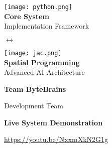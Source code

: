 \documentclass[12pt,a4paper]{article}
\begin{document}
\begin{titlepage}
\begin{tcolorbox}[
        colback=premiumgray,
        colframe=deepblue,
        boxrule=2pt,
        arc=3mm,
        width=0.9\textwidth
    ]
        \begin{minipage}{0.35\textwidth}
            \centering
            \texttt{[image: python.png]}
            \\[0.5cm]
            {\large\textbf{Core System}}\\
            {\small Implementation Framework}
        \end{minipage}
        \hspace{1cm}
        {\Large\color{accentorange}$\leftrightarrow$}
        \hspace{1cm}
        \begin{minipage}{0.35\textwidth}
            \centering
            \texttt{[image: jac.png]}
            \\[0.5cm]
            {\large\textbf{Spatial Programming}}\\
            {\small Advanced AI Architecture}
        \end{minipage}
    \end{tcolorbox}
    
    \vspace{1.5cm}
    
    {\LARGE\textbf{\color{deepblue}Team ByteBrains}\par}
    \vspace{0.5cm}
    {\large Development Team\par}
    
    \vspace{1.5cm}
    
    \begin{tcolorbox}[
        colback=techblue!10,
        colframe=techblue,
        boxrule=2pt,
        arc=3mm,
        width=0.85\textwidth
    ]
        \centering
        {\large\textbf{\color{techblue}Live System Demonstration}\par}
        \vspace{0.3cm}
        {\Large\color{cyan}\url{https://youtu.be/NxxmXkN2G1g}\par}
    \end{tcolorbox}
    
    \vspace{1.5cm}
    
    
\end{titlepage}

\thispagestyle{empty}
\end{document}

